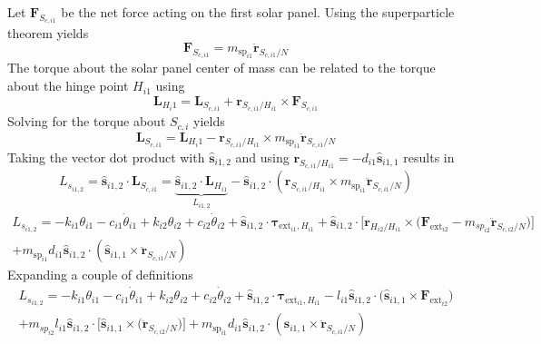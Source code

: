 Let $\bm F_{S_{c,i1}}$ be the net force acting on the first solar panel.  Using the superparticle theorem\cite{schaub} yields
\begin{equation}
	\bm F_{S_{c,i1}} = m_{\text{sp}_{i1}} \ddot{\bm r}_{S_{c,i1}/N}
\end{equation}
The torque about the solar panel center of mass can be related to the torque about the hinge point $H_{i1}$ using
\begin{equation}
	\bm L_{H_i1} = \bm L_{S_{c,i1}} + \bm r_{S_{c,i1}/H_{i1}} \times \bm F_{S_{c,i1}}
\end{equation}
Solving for the torque about $S_{c,i}$ yields
\begin{equation}
	\bm L_{S_{c,i1}} = \bm L_{H_i1} - \bm r_{S_{c,i1}/H_{i1}} \times m_{\text{sp}_{i1}} \ddot{\bm r}_{S_{c,i1}/N}
\end{equation}
Taking the vector dot product with $\hat{\bm s}_{i1,2}$ and using $\bm r_{S_{c,i1}/H_{i1}} = -d_{i1} \hat{\bm s}_{i1,1}$ results in
\begin{equation}
	L_{s_{i1,2}} = \hat{\bm s}_{i1,2} \cdot \bm L_{S_{c,i1}} =  \underbrace{\hat{\bm s}_{i1,2} \cdot \bm L_{H_{i1}}}_{L_{i1,2}}  -  \hat{\bm s}_{i1,2} \cdot \left(
	\bm r_{S_{c,i1}/H_{i1}} \times m_{\text{sp}_{i1}} \ddot{\bm r}_{S_{c,i1}/N} \right)
\end{equation}
\begin{multline}
	L_{s_{i1,2}} = - k_{i1} \theta_{i1} - c_{i1}\dot{\theta}_{i1} +  k_{i2} \theta_{i2} + c_{i2} \dot\theta_{i2} + \hat{\bm s}_{i1,2} \cdot \bm \tau_{\text{ext}_{i1},H_{i1}} + \hat{\bm s}_{i1,2} \cdot \Big[\bm{r}_{H_{i2}/H_{i1}} \times \big(\bm F_{\text{ext}_{i2}}  - m_{sp_{i2}} \ddot{\bm{r}}_{S_{c,i2}/N}\big)\Big]\\
	+ m_{\text{sp}_{i1}} d_{i1} \hat{\bm s}_{i1,2} \cdot \left(\hat{\bm s}_{i1,1} \times  \ddot{\bm r}_{S_{c,i1}/N} \right)
\end{multline}
Expanding a couple of definitions
\begin{multline}
	L_{s_{i1,2}} = - k_{i1} \theta_{i1} - c_{i1}\dot{\theta}_{i1} +  k_{i2} \theta_{i2} + c_{i2} \dot\theta_{i2} + \hat{\bm s}_{i1,2} \cdot \bm \tau_{\text{ext}_{i1},H_{i1}} - l_{i1} \hat{\bm s}_{i1,2} \cdot \big(\hat{\bm s}_{i1,1} \times \bm F_{\text{ext}_{i2}}\big) \\
	+ m_{sp_{i2}} l_{i1} \hat{\bm s}_{i1,2} \cdot \Big[\hat{\bm s}_{i1,1} \times \big( \ddot{\bm{r}}_{S_{c,i2}/N}\big)\Big]
	+ m_{\text{sp}_{i1}} d_{i1} \hat{\bm s}_{i1,2} \cdot \left(\hat{\bm s}_{i1,1} \times  \ddot{\bm r}_{S_{c,i1}/N} \right)
\end{multline}
